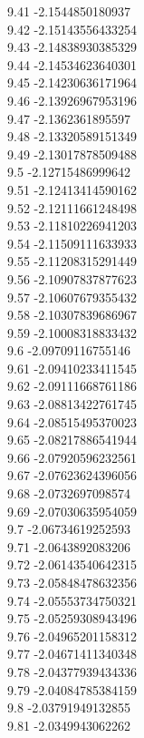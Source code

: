 {9.41	-2.1544850180937\\
9.42	-2.15143556433254\\
9.43	-2.14838930385329\\
9.44	-2.14534623640301\\
9.45	-2.14230636171964\\
9.46	-2.13926967953196\\
9.47	-2.1362361895597\\
9.48	-2.13320589151349\\
9.49	-2.13017878509488\\
9.5	-2.12715486999642\\
9.51	-2.12413414590162\\
9.52	-2.12111661248498\\
9.53	-2.11810226941203\\
9.54	-2.11509111633933\\
9.55	-2.11208315291449\\
9.56	-2.10907837877623\\
9.57	-2.10607679355432\\
9.58	-2.10307839686967\\
9.59	-2.10008318833432\\
9.6	-2.09709116755146\\
9.61	-2.09410233411545\\
9.62	-2.09111668761186\\
9.63	-2.08813422761745\\
9.64	-2.08515495370023\\
9.65	-2.08217886541944\\
9.66	-2.07920596232561\\
9.67	-2.07623624396056\\
9.68	-2.0732697098574\\
9.69	-2.07030635954059\\
9.7	-2.06734619252593\\
9.71	-2.0643892083206\\
9.72	-2.06143540642315\\
9.73	-2.05848478632356\\
9.74	-2.05553734750321\\
9.75	-2.05259308943496\\
9.76	-2.04965201158312\\
9.77	-2.04671411340348\\
9.78	-2.04377939434336\\
9.79	-2.04084785384159\\
9.8	-2.03791949132855\\
9.81	-2.0349943062262\\
}
